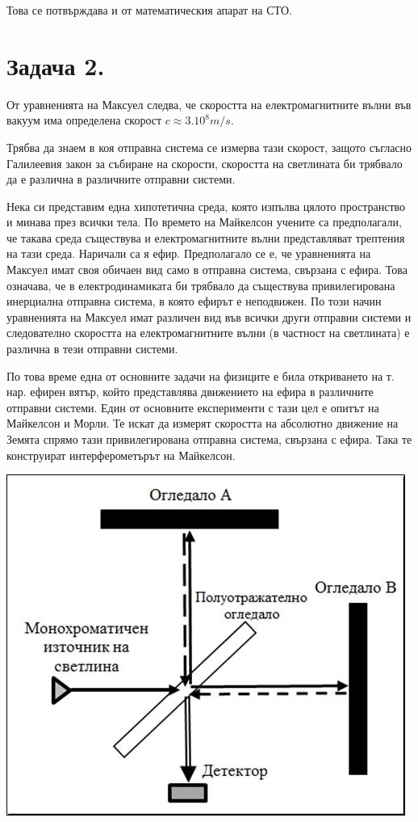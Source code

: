 \documentclass[a4paper,12pt]{article}
\begin{document}
Това се потвърждава и от математическия апарат на СТО.
\pagebreak
\section*{Задача 2.}
От уравненията на Максуел следва, че скоростта на електромагнитните 
вълни във вакуум има определена скорост
$c \approx 3.10^{8} m/s$.

Трябва да знаем в коя отправна система се измерва тази скорост, 
защото съгласно Галилеевия закон за събиране на скорости,
скоростта на светлината би трябвало да е различна в различните отправни системи.

Нека си представим една хипотетична среда, която изпълва цялото пространство и минава през всички тела. 
По времето на Майкелсон учените са предполагали, че такава среда съществува и електромагнитните вълни 
представляват трептения на тази среда. Наричали са я ефир. Предполагало се е, че уравненията на Максуел имат 
своя обичаен вид само в отправна система, свързана с ефира.
Това означава, че в електродинамиката би трябвало да съществува привилегирована
инерциална отправна система, в която ефирът е неподвижен. 
По този начин уравненията на Максуел имат различен вид във всички други отправни системи
и следователно скоростта на електромагнитните вълни (в частност на светлината)
е различна в тези отправни системи.

По това време една от основните задачи на физиците е била откриването на т. нар. 
ефирен вятър, който представлява движението на ефира в различните отправни системи.
Един от основните експерименти с тази цел е опитът на Майкелсон и Морли.
Те искат да измерят скоростта на абсолютно движение на Земята спрямо тази привилегирована отправна система, свързана 
с ефира. 
Така те конструират интерферометърът на Майкелсон.
\begin{center}
    \includegraphics{image01.jpg}
\end{center}
\end{document}
